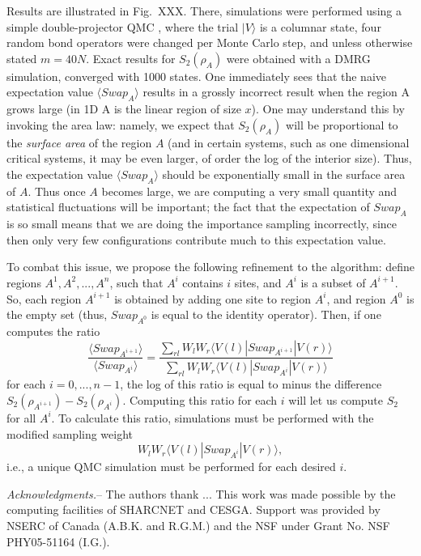 \documentclass[prl,aps,twocolumn,floatfix,amsmath,amssymb,superscriptaddress,tightenlines]{revtex4}
\begin{document}
Results are illustrated in Fig.~XXX.  There, simulations were performed using a simple double-projector QMC \cite{Sandvik}, where
the trial $| V \rangle$ is a columnar state, four random bond operators were changed per Monte Carlo step, and unless otherwise
stated $m=40N$.  Exact results for $S_2(\rho_A)$ were obtained with a DMRG simulation, converged with 1000 states.  One 
immediately sees that the naive expectation value $\langle Swap_A \rangle$ results in a grossly incorrect result when the region
A grows large (in 1D A is the linear region of size $x$).   
One may understand this by invoking the area law: namely,
we expect
that $S_2(\rho_A)$ will be proportional to the {\it surface area} of the region
$A$ (and in certain systems, such as one dimensional critical systems, it
may be even larger, of order the log of the interior size).  Thus,
the expectation value $\langle Swap_A \rangle$ should be exponentially small in the
surface area of $A$.  Thus once $A$ becomes
large, we are computing a very small quantity and
statistical fluctuations will be important;
the fact that the expectation
of $Swap_A$ is so small means that we are doing the importance sampling
incorrectly, since then only very few configurations contribute much to this
expectation value.

To combat this issue, we propose the following refinement to the algorithm: define regions $A^1,A^2,...,A^n$, such
that $A^i$ contains $i$ sites, and $A^i$ is a subset of $A^{i+1}$.  So, each region $A^{i+1}$ is obtained by adding one site to region
$A^{i}$, and region $A^0$ is the empty set (thus, $Swap_{A^0}$ is equal to the identity operator).
Then, if one computes the ratio
\begin{equation}
\frac{\langle Swap_{A^{i+1}}\rangle}{\langle Swap_{A^{i}}\rangle}
= \frac{\sum_{rl} W_l W_r \langle V(l) | Swap_{A^{i+1}} | V(r) \rangle} {\sum_{rl} W_l W_r \langle V(l) | Swap_{A^i} | V(r) \rangle}
\end{equation}
for each $i=0,...,n-1$, the log of this ratio is equal to minus the
difference $S_2(\rho_{A^{i+1}})-S_2(\rho_{A^{i}})$.
Computing this ratio for each $i$ will let us compute $S_2$ for all $A^i$.  To calculate this ratio, simulations must be performed 
with the modified sampling weight
\begin{equation}
W_l W_r \langle V(l) | Swap_{A^i} | V(r) \rangle,
\end{equation}
i.e., a unique QMC simulation must be performed for each desired $i$.

{\it Acknowledgments.}-- The authors thank ...
This work was made possible by the
computing facilities of SHARCNET and CESGA.  Support was provided by NSERC
of Canada (A.B.K. and R.G.M.) and the NSF under Grant No. NSF PHY05-51164
(I.G.).


\end{document}
